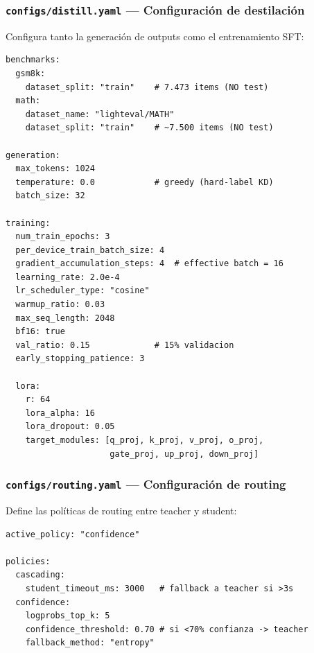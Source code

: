 \documentclass[11pt,a4paper]{article}
\begin{document}
\subsubsection{\texttt{configs/distill.yaml} --- Configuraci\'on de destilaci\'on}

Configura tanto la generaci\'on de outputs como el entrenamiento SFT:

\begin{lstlisting}[language={},caption={Extracto de distill.yaml}]
benchmarks:
  gsm8k:
    dataset_split: "train"    # 7.473 items (NO test)
  math:
    dataset_name: "lighteval/MATH"
    dataset_split: "train"    # ~7.500 items (NO test)

generation:
  max_tokens: 1024
  temperature: 0.0            # greedy (hard-label KD)
  batch_size: 32

training:
  num_train_epochs: 3
  per_device_train_batch_size: 4
  gradient_accumulation_steps: 4  # effective batch = 16
  learning_rate: 2.0e-4
  lr_scheduler_type: "cosine"
  warmup_ratio: 0.03
  max_seq_length: 2048
  bf16: true
  val_ratio: 0.15             # 15% validacion
  early_stopping_patience: 3

  lora:
    r: 64
    lora_alpha: 16
    lora_dropout: 0.05
    target_modules: [q_proj, k_proj, v_proj, o_proj,
                     gate_proj, up_proj, down_proj]
\end{lstlisting}

\subsubsection{\texttt{configs/routing.yaml} --- Configuraci\'on de routing}

Define las pol\'iticas de routing entre teacher y student:

\begin{lstlisting}[language={},caption={Extracto de routing.yaml}]
active_policy: "confidence"

policies:
  cascading:
    student_timeout_ms: 3000   # fallback a teacher si >3s
  confidence:
    logprobs_top_k: 5
    confidence_threshold: 0.70 # si <70% confianza -> teacher
    fallback_method: "entropy"
\end{lstlisting}

\end{document}
